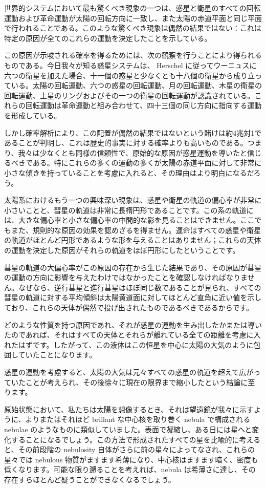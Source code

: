 \documentclass[a4paper,11pt,openany]{ltjsbook}
\begin{document}
世界的システムにおいて最も驚くべき現象の一つは、惑星と衛星のすべての回転運動および革命運動が太陽の回転方向に一致し、また太陽の赤道平面と同じ平面で行われることである。このような驚くべき現象は偶然の結果ではない：これは特定の原因が全てのこれらの運動を決定したことを示している。

この原因が示唆される確率を得るためには、次の観察を行うことにより得られるものである。今日我々が知る惑星システムは、 Herschel に従ってウーニュスに六つの衛星を加えた場合、十一個の惑星と少なくとも十八個の衛星から成り立っている。太陽の回転運動、六つの惑星の回転運動、月の回転運動、木星の衛星の回転運動、土星のリングおよびその一つの衛星の回転運動が認識されている。これらの回転運動は革命運動と組み合わせて、四十三個の同じ方向に指向する運動を形成している。

しかし確率解析により、この配置が偶然の結果ではないという賭けは約4兆対1であることが判明し、これは歴史的事実に対する確率よりも高いものである。つまり、我々は少なくとも同様の信頼性で、原始的な原因が惑星運動を導いたと信じるべきである。特にこれらの多くの運動の多くが太陽の赤道平面に対して非常に小さな傾きを持っていることを考慮に入れると、その理由はより明白になるだろう。

太陽系におけるもう一つの興味深い現象は、惑星や衛星の軌道の偏心率が非常に小さいことと、彗星の軌道は非常に長楕円形であることです。この系の軌道には、大きな偏心率と小さな偏心率の中間的な影を見ることはできません。ここでもまた、規則的な原因の効果を認めざるを得ません。運命はすべての惑星や衛星の軌道がほとんど円形であるような形を与えることはありません；これらの天体の運動を決定した原因がそれらの軌道をほぼ円形にしたということです。

彗星の軌道の大偏心率がこの原因の存在から生じた結果であり、その原因が彗星の運動の方向に影響を与えたわけではなかったことを確認しなければなりません。なぜなら、逆行彗星と進行彗星はほぼ同じ数であることが見られ、すべての彗星の軌道に対する平均傾斜は太陽黄道面に対してほとんど直角に近い値を示しており、これらの天体が偶然で投げ出されたものであるべきであるからです。

どのような性質を持つ原因であれ、それが惑星の運動を生み出したかまたは導いたのであれば、それはすべての天体とそれらが離れている全ての距離を考慮に入れたはずです。したがって、この液体はこの恒星を中心に太陽の大気のように包囲していたことになります。

惑星の運動を考慮すると、太陽の大気は元々すべての惑星の軌道を超えて広がっていたことが考えられ、その後徐々に現在の限界まで縮小したという結論に至ります。

原始状態において、私たちは太陽を想像するとき、それは望遠鏡が我々に示すように、よりまたはそれほど brillant な中心核を取り巻く nebula で構成される nebulae のようなものに類似していました。表面で凝縮し、ある日には星へと変化することになるでしょう。この方法で形成されたすべての星を比喩的に考えると、その前段階の nebulosity 自体がさらに前の星々によってなされ、これらの星々では nebulous 物質がますます希薄になり、中心核はますます暗く、密度も低くなります。可能な限り遡ることを考えれば、nebula は希薄さに達し、その存在すらほとんど疑うことができなくなるでしょう。
\end{document}
